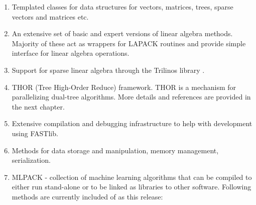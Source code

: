\documentclass[letter]{report}
\begin{document}
\begin{enumerate}
\item Templated classes for data structures for vectors, matrices, trees, sparse vectors and matrices etc.
\item An extensive set of basic and expert versions of linear algebra methods. Majority of these act as wrappers for LAPACK routines and provide simple interface for linear algebra operations.
\item Support for sparse linear algebra through the Trilinos library \cite{heroux2005otp}.
\item THOR (Tree High-Order Reduce) framework. THOR is a mechanism for parallelizing dual-tree algorithms. More details and references are provided in the next chapter.
\item Extensive compilation and debugging infrastructure to help with development using FASTlib.
\item Methods for data storage and manipulation, memory management, serialization.
\item MLPACK - collection of machine learning algorithms that can be compiled to either run stand-alone or to be linked as libraries to other software. Following methods are currently included of as this release:


\end{enumerate}
\end{document}
